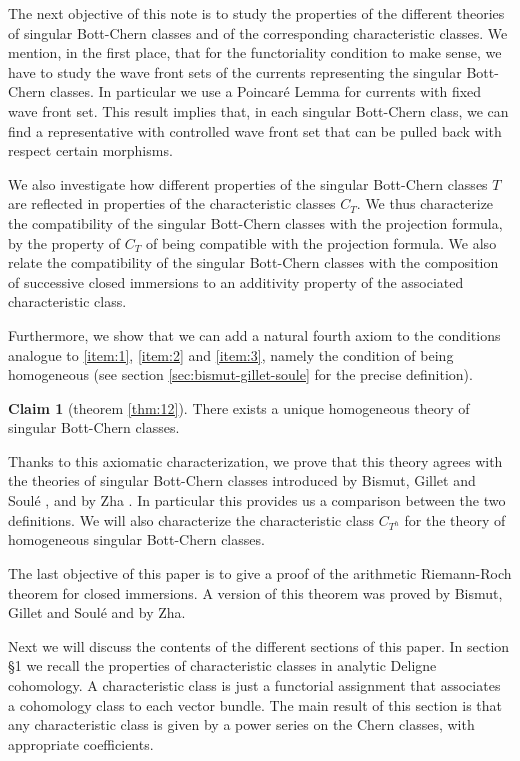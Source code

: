 \documentclass[10pt,twoside]{article}
\numberwithin{equation}{section}
\theoremstyle{plain}
\theoremstyle{definition}
\newtheorem{claim}{Claim}
\begin{document}
The next objective of this note is to study the properties of the
different theories of singular 
Bott-Chern classes and of the corresponding characteristic classes.
We mention, in the first place, that for the functoriality condition
to make sense, we have to study the wave front sets of the currents
representing the singular Bott-Chern classes. In particular we use a
Poincar\'e Lemma for currents with fixed wave front set. This result
implies that, in each singular Bott-Chern class, we can find a
representative with controlled wave front set that can be pulled back
with respect certain morphisms.

We also  investigate how different properties of the singular Bott-Chern
classes $T$ are reflected in properties of the characteristic
classes $C_T$. We thus characterize the compatibility of the
singular Bott-Chern classes with the projection formula, by the
property of $C_T$ of being compatible with the
  projection formula. We
also relate the compatibility of the singular Bott-Chern classes
with the composition of successive closed immersions to an
additivity property of the associated characteristic class. 


Furthermore, we show that we can add a 
natural fourth axiom to the conditions analogue to \ref{item:1},
\ref{item:2} and \ref{item:3}, namely the condition of being
homogeneous (see section \ref{sec:bismut-gillet-soule} for the precise
definition). 

\begin{claim} [theorem \ref{thm:12}] There exists a unique homogeneous
  theory of singular Bott-Chern classes.
\end{claim}

Thanks to this axiomatic characterization, we prove that this theory
agrees with the theories 
of singular Bott-Chern classes introduced by  Bismut, Gillet and
Soul\'e \cite{BismutGilletSoule:MR1086887}, and by Zha
\cite{zha99:_rieman_roch}. In particular
this provides us a comparison
between the two definitions. We will also characterize 
the characteristic class $C_{T^h}$ for the theory
of homogeneous singular Bott-Chern classes.

The last objective of this paper is to give a proof of the arithmetic
Riemann-Roch theorem for closed immersions. A version of this theorem
was proved by Bismut, Gillet and Soul\'e and by Zha.

Next we will discuss the contents of the different sections of this paper. 
In section \S 1 we recall the properties of characteristic classes in
analytic Deligne cohomology. A characteristic class is just a
functorial assignment that associates a
cohomology class to each vector bundle. The main result of this
section is that any 
characteristic class is given by a power series on the Chern classes,
with appropriate 
coefficients.
\end{document}
